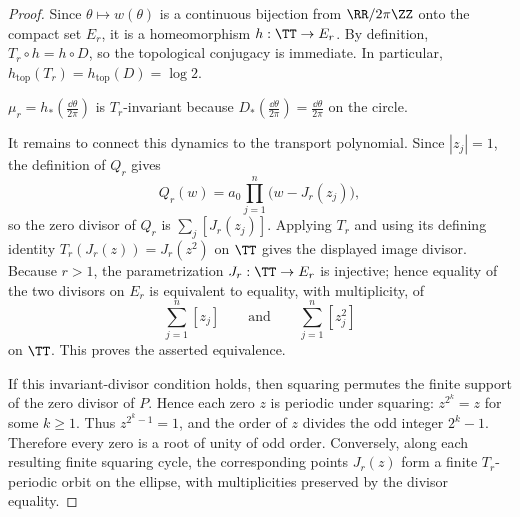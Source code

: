 \begin{proof}
Since \(\theta\mapsto w(\theta)\) is a continuous bijection from \(\RR/2\pi\ZZ\) onto the compact set \(E_r\), it is a homeomorphism \(h:\TT\to E_r\).
By definition, \(T_r\circ h=h\circ D\), so the topological conjugacy is immediate. In particular, \(h_{\mathrm{top}}(T_r)=h_{\mathrm{top}}(D)=\log 2\).
\par
\(\mu_r=h_\ast(\frac{\dd\theta}{2\pi})\) is \(T_r\)-invariant because
\(
D_\ast(\frac{\dd\theta}{2\pi})=\frac{\dd\theta}{2\pi}
\)
on the circle.

It remains to connect this dynamics to the transport polynomial. Since \(|z_j|=1\), the definition of \(Q_r\) gives
\[
Q_r(w)=a_0\prod_{j=1}^{n}\bigl(w-J_r(z_j)\bigr),
\]
so the zero divisor of \(Q_r\) is \(\sum_j[J_r(z_j)]\). Applying \(T_r\) and using its defining identity \(T_r(J_r(z))=J_r(z^2)\) on \(\TT\) gives the displayed image divisor. Because \(r>1\), the parametrization \(J_r:\TT\to E_r\) is injective; hence equality of the two divisors on \(E_r\) is equivalent to equality, with multiplicity, of
\[
\sum_{j=1}^{n}[z_j]
\qquad\text{and}\qquad
\sum_{j=1}^{n}[z_j^2]
\]
on \(\TT\). This proves the asserted equivalence.

If this invariant-divisor condition holds, then squaring permutes the finite support of the zero divisor of \(P\). Hence each zero \(z\) is periodic under squaring: \(z^{2^k}=z\) for some \(k\ge1\). Thus \(z^{2^k-1}=1\), and the order of \(z\) divides the odd integer \(2^k-1\). Therefore every zero is a root of unity of odd order. Conversely, along each resulting finite squaring cycle, the corresponding points \(J_r(z)\) form a finite \(T_r\)-periodic orbit on the ellipse, with multiplicities preserved by the divisor equality.
\end{proof}

